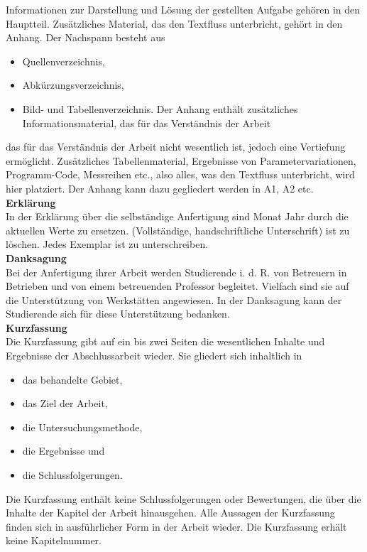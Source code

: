 Informationen zur Darstellung und Lösung der gestellten Aufgabe gehören in den Hauptteil. Zusätzliches Material, das den Textfluss unterbricht, gehört in den Anhang.  Der Nachspann besteht aus 

\begin{itemize}
\item Quellenverzeichnis, 
\item Abkürzungsverzeichnis, 
\item Bild- und Tabellenverzeichnis.  Der Anhang enthält zusätzliches Informationsmaterial, das für das Verständnis der Arbeit 
\end{itemize}

das für das Verständnis der Arbeit nicht wesentlich ist, jedoch eine Vertiefung ermöglicht. Zusätzliches Tabellenmaterial, Ergebnisse von Parametervariationen, Programm-Code, Messreihen etc., also alles, was den Textfluss unterbricht, wird hier platziert. Der Anhang kann dazu gegliedert werden in A1, A2 etc.\\  

\textbf{Erklärung}\\
In der Erklärung über die selbständige Anfertigung sind Monat Jahr durch die aktuellen Werte zu ersetzen. (Vollständige, handschriftliche Unterschrift) ist zu löschen. Jedes Exemplar ist zu unterschreiben. \\

\textbf{Danksagung}\\ 
Bei der Anfertigung ihrer Arbeit werden Studierende i. d. R. von Betreuern in Betrieben und von einem betreuenden Professor begleitet. Vielfach sind sie auf die Unterstützung von Werkstätten angewiesen. In der Danksagung kann der Studierende sich für diese Unterstützung bedanken.  \\

\textbf{Kurzfassung}\\ 
Die Kurzfassung gibt auf ein bis zwei Seiten die wesentlichen Inhalte und Ergebnisse der Abschlussarbeit wieder. Sie gliedert sich inhaltlich in 
\begin{itemize}
\item das behandelte Gebiet, 
\item das Ziel der Arbeit, 
\item die Untersuchungsmethode,  
\item die Ergebnisse und 
\item die Schlussfolgerungen.
\end{itemize}

Die Kurzfassung enthält keine Schlussfolgerungen oder Bewertungen, die über die Inhalte der Kapitel der Arbeit hinausgehen. Alle Aussagen der Kurzfassung finden sich in ausführlicher Form in der Arbeit wieder. Die Kurzfassung erhält keine Kapitelnummer. \\

